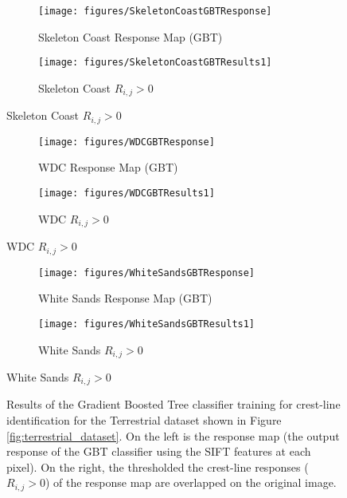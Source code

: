 \begin{figure}[H]
	\ContinuedFloat
	\centering
	\begin{subfigure}{0.48\textwidth}
		\centering
		\texttt{[image: figures/SkeletonCoastGBTResponse]}
		\caption{Skeleton Coast Response Map (GBT)}
		\label{fig:SkeletonCoast_gbt_response}
	\end{subfigure}
	\begin{subfigure}{0.48\textwidth}
		\centering
		\texttt{[image: figures/SkeletonCoastGBTResults1]}
		\caption{ Skeleton Coast $R_{i,j} > 0$}
		\label{fig:SkeletonCoast_gbt_response_overlay}
	\end{subfigure}
\end{figure}
\begin{figure}[H]
	\ContinuedFloat
	\centering
	\begin{subfigure}{0.48\textwidth}
		\centering
		\texttt{[image: figures/WDCGBTResponse]}
		\caption{WDC Response Map (GBT)}
		\label{fig:WDC_gbt_response}
	\end{subfigure}
	\begin{subfigure}{0.48\textwidth}
		\centering
		\texttt{[image: figures/WDCGBTResults1]}
		\caption{ WDC $R_{i,j} > 0$}
		\label{fig:WDC_gbt_response_overlay}
	\end{subfigure}
\end{figure}
\begin{figure}[H]
	\ContinuedFloat
	\centering
	\begin{subfigure}{0.48\textwidth}
		\centering
		\texttt{[image: figures/WhiteSandsGBTResponse]}
		\caption{White Sands Response Map (GBT)}
		\label{fig:WhiteSands_gbt_response}
	\end{subfigure}
	\begin{subfigure}{0.48\textwidth}
		\centering
		\texttt{[image: figures/WhiteSandsGBTResults1]}
		\caption{ White Sands $R_{i,j} > 0$}
		\label{fig:WhiteSands_gbt_response_overlay}
	\end{subfigure}
\end{figure}
\begin{figure}[H]
	\ContinuedFloat
	\centering
	\caption{Results of the Gradient Boosted Tree classifier training for crest-line identification for the Terrestrial dataset shown in Figure \ref{fig:terrestrial_dataset}. On the left is the response map (the output response of the GBT classifier using the SIFT features at each pixel). On the right, the thresholded the crest-line responses ($R_{i,j} > 0$) of the response map are overlapped on the original image. }
	\label{fig:gbt_response_results}
\end{figure}


